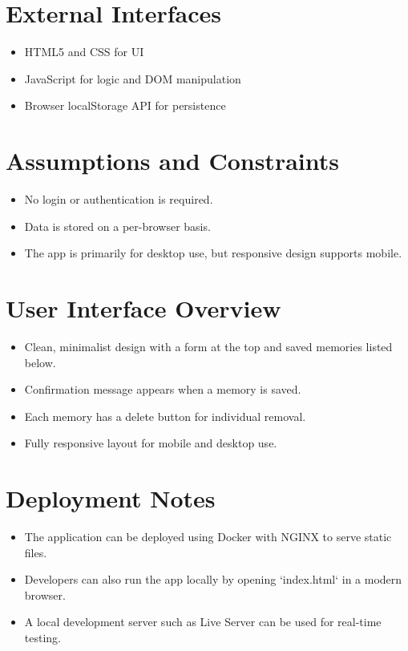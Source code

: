 \documentclass[12pt]{article}
\begin{document}
\section{External Interfaces}
\begin{itemize}
  \item HTML5 and CSS for UI
  \item JavaScript for logic and DOM manipulation
  \item Browser localStorage API for persistence
\end{itemize}

\section{Assumptions and Constraints}
\begin{itemize}
  \item No login or authentication is required.
  \item Data is stored on a per-browser basis.
  \item The app is primarily for desktop use, but responsive design supports mobile.
\end{itemize}

\section{User Interface Overview}
\begin{itemize}
  \item Clean, minimalist design with a form at the top and saved memories listed below.
  \item Confirmation message appears when a memory is saved.
  \item Each memory has a delete button for individual removal.
  \item Fully responsive layout for mobile and desktop use.
\end{itemize}

\section{Deployment Notes}
\begin{itemize}
  \item The application can be deployed using Docker with NGINX to serve static files.
  \item Developers can also run the app locally by opening `index.html` in a modern browser.
  \item A local development server such as Live Server can be used for real-time testing.
\end{itemize}
\end{document}
